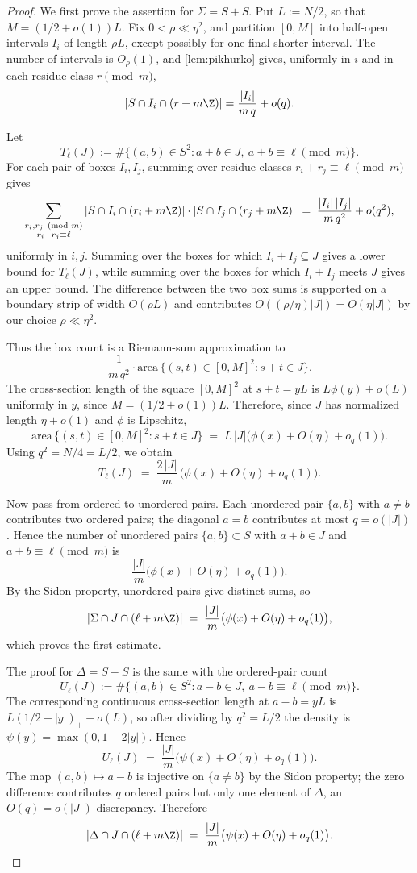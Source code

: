 \documentclass[11pt]{amsart}
\begin{document}
\begin{proof}
We first prove the assertion for $\Sigma = S+S$. Put $L := N/2$, so that $M = (1/2 + o(1))L$. Fix $0 < \rho \ll \eta^2$, and partition $[0, M]$ into half-open intervals $I_i$ of length $\rho L$, except possibly for one final shorter interval. The number of intervals is $O_\rho(1)$, and \cref{lem:pikhurko} gives, uniformly in $i$ and in each residue class $r \pmod m$,
\[
|S \cap I_i \cap (r + m\Z)| = \frac{|I_i|}{m\, q} + o(q).
\]

Let
\[
T_\ell(J) := \#\{(a,b) \in S^2 : a + b \in J,\ a + b \equiv \ell \pmod m\}.
\]
For each pair of boxes $I_i, I_j$, summing over residue classes $r_i + r_j \equiv \ell \pmod m$ gives
\[
\sum_{\substack{r_i, r_j \pmod m \\ r_i + r_j \equiv \ell}}
|S \cap I_i \cap (r_i + m\Z)| \cdot |S \cap I_j \cap (r_j + m\Z)|
\;=\; \frac{|I_i|\,|I_j|}{m\,q^2} + o(q^2),
\]
uniformly in $i, j$. Summing over the boxes for which $I_i + I_j \subseteq J$ gives a lower bound for $T_\ell(J)$, while summing over the boxes for which $I_i + I_j$ meets $J$ gives an upper bound. The difference between the two box sums is supported on a boundary strip of width $O(\rho L)$ and contributes $O((\rho/\eta) |J|) = O(\eta |J|)$ by our choice $\rho \ll \eta^2$.

Thus the box count is a Riemann-sum approximation to
\[
\frac{1}{m\,q^2} \cdot \mathrm{area}\,\{(s,t) \in [0,M]^2 : s + t \in J\}.
\]
The cross-section length of the square $[0,M]^2$ at $s + t = yL$ is $L\phi(y) + o(L)$ uniformly in $y$, since $M = (1/2 + o(1))L$. Therefore, since $J$ has normalized length $\eta + o(1)$ and $\phi$ is Lipschitz,
\[
\mathrm{area}\,\{(s,t) \in [0,M]^2 : s + t \in J\} \;=\; L\,|J|\bigl(\phi(x) + O(\eta) + o_q(1)\bigr).
\]
Using $q^2 = N/4 = L/2$, we obtain
\[
T_\ell(J) \;=\; \frac{2\,|J|}{m}\,\bigl(\phi(x) + O(\eta) + o_q(1)\bigr).
\]

Now pass from ordered to unordered pairs. Each unordered pair $\{a,b\}$ with $a \neq b$ contributes two ordered pairs; the diagonal $a = b$ contributes at most $q = o(|J|)$. Hence the number of unordered pairs $\{a,b\} \subset S$ with $a+b \in J$ and $a+b \equiv \ell \pmod m$ is
\[
\frac{|J|}{m}\bigl(\phi(x) + O(\eta) + o_q(1)\bigr).
\]
By the Sidon property, unordered pairs give distinct sums, so
\[
|\Sigma \cap J \cap (\ell + m\Z)| \;=\; \frac{|J|}{m}\bigl(\phi(x) + O(\eta) + o_q(1)\bigr),
\]
which proves the first estimate.

The proof for $\Delta = S - S$ is the same with the ordered-pair count
\[
U_\ell(J) := \#\{(a,b) \in S^2 : a - b \in J,\ a - b \equiv \ell \pmod m\}.
\]
The corresponding continuous cross-section length at $a - b = yL$ is $L(1/2 - |y|)_+ + o(L)$, so after dividing by $q^2 = L/2$ the density is $\psi(y) = \max(0, 1 - 2|y|)$. Hence
\[
U_\ell(J) \;=\; \frac{|J|}{m}\bigl(\psi(x) + O(\eta) + o_q(1)\bigr).
\]
The map $(a,b) \mapsto a - b$ is injective on $\{a \neq b\}$ by the Sidon property; the zero difference contributes $q$ ordered pairs but only one element of $\Delta$, an $O(q) = o(|J|)$ discrepancy. Therefore
\[
|\Delta \cap J \cap (\ell + m\Z)| \;=\; \frac{|J|}{m}\bigl(\psi(x) + O(\eta) + o_q(1)\bigr).
\]
\end{proof}
\end{document}
